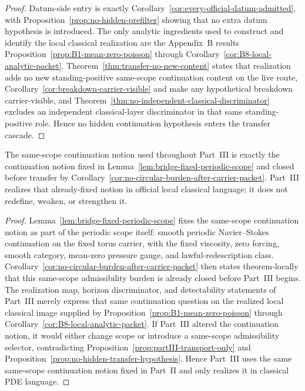 \begin{proof}
Datum-side entry is exactly Corollary~\ref{cor:every-official-datum-admitted}, with Proposition~\ref{prop:no-hidden-prefilter} showing that no extra datum hypothesis is introduced. The only analytic ingredients used to construct and identify the local classical realization are the Appendix~B results Proposition~\ref{prop:B1-mean-zero-poisson} through Corollary~\ref{cor:B8-local-analytic-packet}. Theorem~\ref{thm:transfer-no-new-content} states that realization adds no new standing-positive same-scope continuation content on the live route, Corollary~\ref{cor:breakdown-carrier-visible} and \HorizonDetectabilityRef{} make any hypothetical breakdown carrier-visible, and Theorem~\ref{thm:no-independent-classical-discriminator} excludes an independent classical-layer discriminator in that same standing-positive role. Hence no hidden continuation hypothesis enters the transfer cascade.
\end{proof}

\begin{manualproposition}
\label{prop:partIII-same-continuation-notion}
The same-scope continuation notion used throughout Part~III is exactly the continuation notion fixed in Lemma~\ref{lem:bridge-fixed-periodic-scope} and closed before transfer by Corollary~\ref{cor:no-circular-burden-after-carrier-packet}. Part~III realizes that already-fixed notion in official local classical language; it does not redefine, weaken, or strengthen it.
\end{manualproposition}

\begin{proof}
Lemma~\ref{lem:bridge-fixed-periodic-scope} fixes the same-scope continuation notion as part of the periodic scope itself: smooth periodic Navier--Stokes continuation on the fixed torus carrier, with the fixed viscosity, zero forcing, smooth category, mean-zero pressure gauge, and lawful-redescription class. Corollary~\ref{cor:no-circular-burden-after-carrier-packet} then states theorem-locally that this same-scope admissibility burden is already closed before Part~III begins. The realization map, horizon discriminator, and detectability statements of Part~III merely express that same continuation question on the realized local classical image supplied by Proposition~\ref{prop:B1-mean-zero-poisson} through Corollary~\ref{cor:B8-local-analytic-packet}. If Part~III altered the continuation notion, it would either change scope or introduce a same-scope admissibility selector, contradicting Proposition~\ref{prop:partIII-transport-only} and Proposition~\ref{prop:no-hidden-transfer-hypothesis}. Hence Part~III uses the same same-scope continuation notion fixed in Part~II and only realizes it in classical PDE language.
\end{proof}

